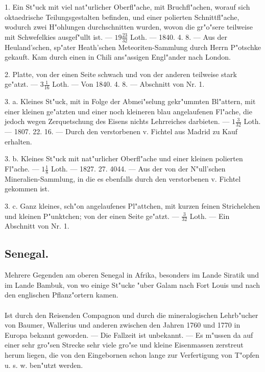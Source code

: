 \documentclass[a4paper, 11pt, oneside, polutonikogreek, german]{article}
\begin{document}
1. Ein St"uck mit viel nat"urlicher Oberfl"ache, mit Bruchfl"achen, worauf sich oktaedrische Teilungsgestalten befinden, und einer polierten Schnittfl"ache, wodurch zwei H"ohlungen durchschnitten wurden, wovon die gr"o"sere teilweise mit Schwefelkies ausgef"ullt ist. --- $19\frac{23}{32}$ Loth. --- 1840. 4. 8. --- Aus der Heuland'schen, sp"ater Heath'schen Meteoriten-Sammlung durch Herrn P"otschke gekauft. Kam durch einen in Chili ans"assigen Engl"ander nach London.

2. Platte, von der einen Seite schwach und von der anderen teilweise stark ge"atzt. --- $3\frac{1}{16}$ Loth. --- Von 1840. 4. 8. --- Abschnitt von Nr. 1.

3. a. Kleines St"uck, mit in Folge der Abmei"selung gekr"ummten Bl"attern, mit einer kleinen ge"atzten und einer noch kleineren blau angelaufenen Fl"ache, die jedoch wegen Zerquetschung des Eisens nichts Lehrreiches darbieten. --- $1\frac{3}{32}$ Loth. --- 1807. 22. 16. --- Durch den verstorbenen v. Fichtel aus Madrid zu Kauf erhalten.

3. b. Kleines St"uck mit nat"urlicher Oberfl"ache und einer kleinen polierten Fl"ache. --- $1\frac{1}{8}$ Loth. --- 1827. 27. 4044. --- Aus der von der N"ull'schen Mineralien-Sammlung, in die es ebenfalls durch den verstorbenen v. Fichtel gekommen ist.

3. c. Ganz kleines, sch"on angelaufenes Pl"attchen, mit kurzen feinen Strichelchen und kleinen P"unktchen; von der einen Seite ge"atzt. --- $\frac{3}{32}$ Loth. --- Ein Abschnitt von Nr. 1.
\subsection{Senegal.}
\begin{center}
\small
Mehrere Gegenden am oberen Senegal in Afrika, besonders im Lande Siratik und im Lande Bambuk, von wo einige St"ucke "uber Galam nach Fort Louis und nach den englischen Pflanz"ortern kamen.
\end{center}
\paragraph{}
Ist durch den Reisenden Compagnon und durch die mineralogischen Lehrb"ucher von Baumer, Wallerius und anderen zwischen den Jahren 1760 und 1770 in Europa bekannt geworden. --- Die Fallzeit ist unbekannt. --- Es m"ussen da auf einer sehr gro"sen Strecke sehr viele gro"se und kleine Eisenmassen zerstreut herum liegen, die von den Eingebornen schon lange zur Verfertigung von T"opfen u. s. w. ben"utzt werden.
\end{document}
